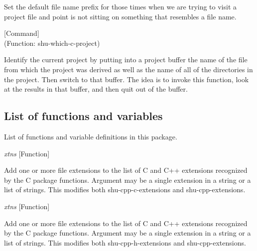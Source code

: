 \begin{doc-string}
Set the default file name prefix for those times when we are trying to visit
a project file and point is not sitting on something that resembles a file name.
\end{doc-string}

\vspace{1em}
\noindent
{}
\usebox{\funcname}
 \hfill [Command]\\%
 (Function: shu-which-c-project)

\begin{doc-string}
Identify the current project by putting into a project buffer the name of the file
from which the project was derived as well as the name of all of the directories in the
project.  Then switch to that buffer.  The idea is to invoke this function, look at the
results in that buffer, and then quit out of the buffer.
\end{doc-string}

\subsection{List of functions and variables}

List of functions and variable definitions in this package.



\vspace{1em}
\noindent
{}
\usebox{\funcname}\emph{xtns}
 \hfill [Function]

\begin{doc-string}
Add one or more file extensions to the list of C and C++ extensions recognized by the
C package functions.  Argument may be a single extension in a string or a list of strings.
This modifies both shu-cpp-c-extensions and shu-cpp-extensions.
\end{doc-string}

\vspace{1em}
\noindent
{}
\usebox{\funcname}\emph{xtns}
 \hfill [Function]

\begin{doc-string}
Add one or more file extensions to the list of C and C++ extensions recognized by the
C package functions.  Argument may be a single extension in a string or a list of strings.
This modifies both shu-cpp-h-extensions and shu-cpp-extensions.
\end{doc-string}

